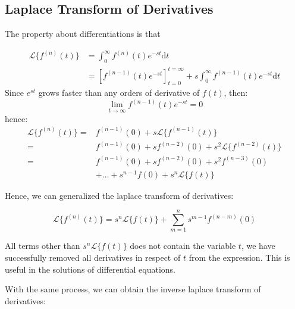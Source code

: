 \documentclass[12pt]{article}
\begin{document}
\subsection{Laplace Transform of Derivatives}
The property about differentiations is that

\begin{align*}
    \mathcal{L}\{f^{(n)}(t)\} 
    &=  \int_{0}^{\infty} f^{(n)}(t) e^{-st} \mathrm{d}t     \\
    &=  \left[f^{(n-1)}(t) e^{-st}\right]_{t=0}^{t=\infty}
            +   s \int_{0}^{\infty} f^{(n-1)}(t) e^{-st} \mathrm{d}t
\end{align*}
Since $e^{st}$ grows faster than any orders of derivative of $f(t)$, then: 
$$\lim_{t\to\infty}f^{(n-1)}(t) e^{-st} = 0$$
hence: 
\begin{align*}
    \mathcal{L}\{f^{(n)}(t)\}   =&  f^{(n-1)}(0)
            +   s \mathcal{L} \{f^{(n-1)}(t)\}  \\
    =&  f^{(n-1)}(0)
            +   s f^{(n-2)}(0)
            +   s^{2} \mathcal{L} \{f^{(n-2)}(t)\}     \\
    =&  f^{(n-1)}(0)
            +   s f^{(n-2)}(0)
            +   s^{2} f^{(n-3)}(0)      \\
            &+   \dots
            +   s^{n-1} f(0)
            +   s^{n} \mathcal{L} \{ f(t) \}
\end{align*}

Hence, we can generalized the laplace transform of derivatives:

\begin{equation}
    \mathcal{L}\{f^{(n)}(t)\}
    =  s^{n} \mathcal{L} \{ f(t) \} + 
        \sum_{m=1}^{n} s^{m-1} f^{(n-m)}(0)
    \label{equ:laplace_transform_of_derivatives}
\end{equation}

All terms other than $s^{n}\mathcal{L} \{ f(t) \}$ does not contain the variable $t$, 
we have successfully removed all derivatives in respect of $t$ from the expression. 
This is useful in the solutions of differential equations.

With the same process, we can obtain the inverse laplace transform of derivatives:
\end{document}
